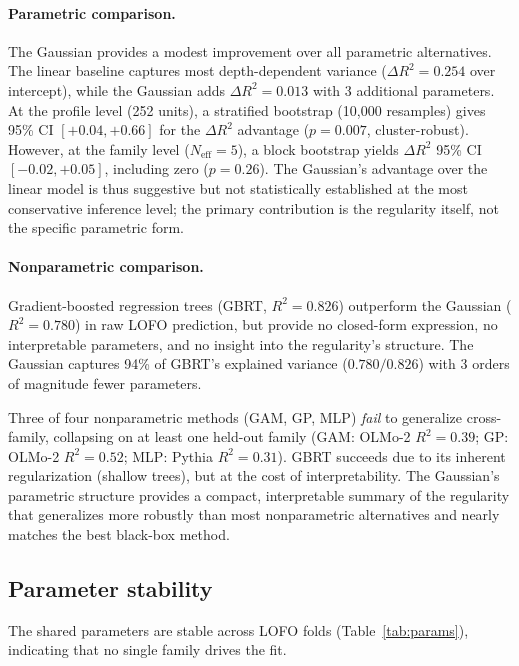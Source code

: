 \documentclass{article}
\begin{document}
\paragraph{Parametric comparison.}
The Gaussian provides a modest improvement over all parametric alternatives. The linear baseline captures most depth-dependent variance ($\Delta R^2 = 0.254$ over intercept), while the Gaussian adds $\Delta R^2 = 0.013$ with 3 additional parameters. At the profile level (252 units), a stratified bootstrap (10{,}000 resamples) gives 95\% CI $[+0.04, +0.66]$ for the $\Delta R^2$ advantage ($p = 0.007$, cluster-robust). However, at the family level ($N_{\text{eff}} = 5$), a block bootstrap yields $\Delta R^2$ 95\% CI $[-0.02, +0.05]$, including zero ($p = 0.26$). The Gaussian's advantage over the linear model is thus suggestive but not statistically established at the most conservative inference level; the primary contribution is the regularity itself, not the specific parametric form.

\paragraph{Nonparametric comparison.}
Gradient-boosted regression trees (GBRT, $R^2 = 0.826$) outperform the Gaussian ($R^2 = 0.780$) in raw LOFO prediction, but provide no closed-form expression, no interpretable parameters, and no insight into the regularity's structure. The Gaussian captures 94\% of GBRT's explained variance ($0.780/0.826$) with 3 orders of magnitude fewer parameters.

Three of four nonparametric methods (GAM, GP, MLP) \emph{fail} to generalize cross-family, collapsing on at least one held-out family (GAM: OLMo-2 $R^2 = 0.39$; GP: OLMo-2 $R^2 = 0.52$; MLP: Pythia $R^2 = 0.31$). GBRT succeeds due to its inherent regularization (shallow trees), but at the cost of interpretability. The Gaussian's parametric structure provides a compact, interpretable summary of the regularity that generalizes more robustly than most nonparametric alternatives and nearly matches the best black-box method.

\subsection{Parameter stability}

The shared parameters are stable across LOFO folds (Table~\ref{tab:params}), indicating that no single family drives the fit.
\end{document}
